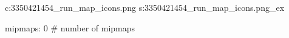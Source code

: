 c:3350421454\textures\sc_run_map_icons.png
s:3350421454\textures\sc_run_map_icons.png_ex

mipmaps: 0  # number of mipmaps
